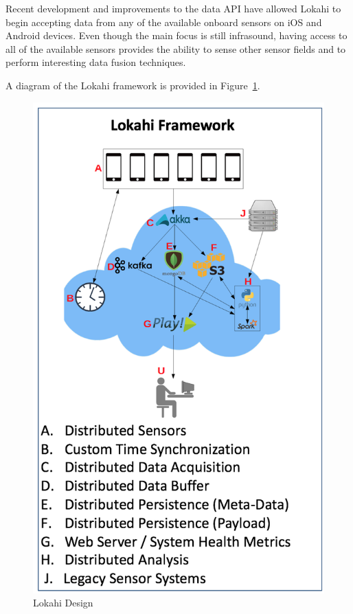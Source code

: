 Recent development and improvements to the data API have allowed Lokahi to begin accepting data from any of the available onboard sensors on iOS and Android devices. Even though the main focus is still infrasound, having access to all of the available sensors provides the ability to sense other sensor fields and to perform interesting data fusion techniques.

A diagram of the Lokahi framework is provided in Figure~\ref{fig:lokahi}.


\begin{figure}
	\centering
	\includegraphics[]{figures/lokahi.png}
	\caption{Lokahi Design}\label{fig:lokahi}
\end{figure}

